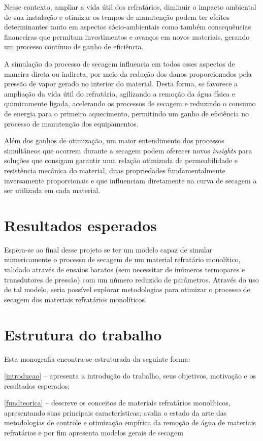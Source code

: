 Nesse contexto, ampliar a vida útil dos refratários, diminuir o impacto
ambiental de sua instalação e otimizar os tempos de manutenção podem ter efeitos
determinantes tanto em aspectos sócio-ambientais como também consequências
financeiras que permitam investimentos e avanços em novos materiais, gerando um
processo contínuo de ganho de eficiência.

A simulação do processo de secagem influencia em todos esses aspectos de maneira
direta ou indireta, por meio da redução dos danos proporcionados pela pressão de
vapor gerado no interior do material. Desta forma, se favorece a ampliação da
vida útil do refratário, agilizando a remoção da água física e quimicamente
ligada, acelerando os processos de secagem e reduzindo o consumo de energia para
o primeiro aquecimento, permitindo um ganho de eficiência no processo de
manutenção dos equipamentos.

Além dos ganhos de otimização, um maior entendimento dos processos simultâneos
que ocorrem durante a secagem podem oferecer novos \textit{insights} para
soluções que consigam garantir uma relação otimizada de permeabilidade e
resistência mecânica do material, duas propriedades fundamentalmente
inversamente proporcionais e que influenciam diretamente na curva de secagem a
ser utilizada em cada material.


   \section{Resultados esperados} \label{results-esperados} Espera-se ao final
   desse projeto se ter um modelo capaz de simular numericamente o processo de
   secagem de um material refratário monolítico, validado através de ensaios
   baratos (sem necessitar de inúmeros termopares e transdutores de pressão) com
   um número reduzido de parâmetros. Através do uso de tal modelo, seria
   possível explorar metodologias para otimizar o processo de secagem dos
   materiais refratários monolíticos.

    
\section{Estrutura do trabalho}
    
Esta monografia encontra-se estruturada da seguinte forma:
    
\autoref{introducao} – apresenta a introdução do trabalho, seus objetivos, motivação e os resultados esperados;
    
\autoref{fundteorica} – descreve os conceitos de materiais refratários
monolíticos, apresentando suas principais características; avalia o estado da
arte das metodologias de controle e otimização empírica da remoção de água de
materiais refratários e por fim apresenta modelos gerais de secagem
    
